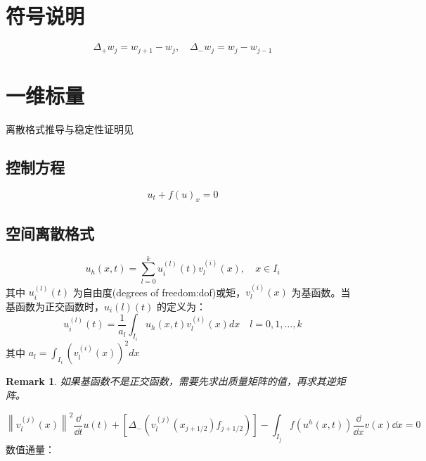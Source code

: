 \documentclass{article}
\newtheorem{remark}{Remark}
\numberwithin{equation}{subsection}    %
\begin{document}
\section{符号说明}
\begin{equation}
    \Delta_{+} w_{j}=w_{j+1}-w_{j}, \quad \Delta_{-} w_{j}=w_{j}-w_{j-1}
\end{equation}

\section{一维标量}
离散格式推导与稳定性证明见\cite{RN16}
\subsection{控制方程}
\begin{equation}
    u_t+f(u)_x = 0
\end{equation}
\subsection{空间离散格式}
\begin{equation}
    u_{h}(x, t)=\sum_{l=0}^{k} u_{i}^{(l)}(t) v_{l}^{(i)}(x), \quad x \in I_{i}
\end{equation}
其中 $u_i^{(l)}(t)$ 为自由度(degrees of freedom:dof)或矩，$v_l^{(i)}(x)$ 为基函数。当基函数为正交函数时，$u_i{(l)}(t)$ 的定义为：
\begin{equation}
    u_{i}^{(l)}(t)=\frac{1}{a_{l}} \int_{I_{i}} u_{h}(x, t) v_{l}^{(i)}(x) d x \quad l=0,1, \ldots, k
\end{equation}
其中 $a_{l}=\int_{I_{i}}\left(v_{l}^{(i)}(x)\right)^{2} d x$
\begin{remark}
    如果基函数不是正交函数，需要先求出质量矩阵的值，再求其逆矩阵。
\end{remark}

\begin{equation}
    \left\|v_{l}^{(j)}(x)\right\|^{2} \dfrac{\dd}{\dd t} u(t)+\left[\Delta_{-}\left(v_{l}^{(j)}\left(x_{j+1 / 2}\right) f_{j+1 / 2}\right)\right]-\int_{I_{j}} f\left(u^{h}(x, t)\right) \dfrac{\dd}{\dd x} v(x) \dd x=0
\end{equation}
数值通量：
\end{document}
